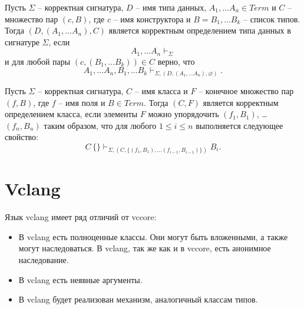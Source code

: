\documentclass{amsart}
\theoremstyle{definition}
\theoremstyle{remark}
\numberwithin{figure}{section}
\begin{document}
Пусть $\Sigma$ -- корректная сигнатура, $D$ -- имя типа данных, $A_1, \ldots A_n \in Term$ и $C$ -- множество пар $(c,B)$, где $c$ -- имя конструктора и $B = B_1, \ldots B_k$ -- список типов.
Тогда $(D, (A_1, \ldots A_n), C)$ является корректным определением типа данных в сигнатуре $\Sigma$, если
\[ A_1, \ldots A_n \vdash_\Sigma \]
и для любой пары $(c, (B_1, \ldots B_k)) \in C$ верно, что
\[ A_1, \ldots A_n, B_1, \ldots B_k \vdash_{\Sigma, (D, (A_1, \ldots A_n), \varnothing)}. \]

Пусть $\Sigma$ -- корректная сигнатура, $C$ -- имя класса и $F$ -- конечное множество пар $(f,B)$, где $f$ -- имя поля и $B \in Term$.
Тогда $(C, F)$ является корректным определением класса, если элементы $F$ можно упорядочить $(f_1, B_1)$, \ldots $(f_n, B_n)$ таким образом, что для любого $1 \leq i \leq n$ выполняется следующее свойство:
\[ C\,\{ \} \vdash_{\Sigma, (C, \{ (f_1, B_1), \ldots (f_{i-1}, B_{i-1}) \})} B_i. \]

\section{Vclang}

Язык vclang имеет ряд отличий от vccore:
\begin{itemize}
\item В vclang есть полноценные классы.
Они могут быть вложенными, а также могут наследоваться.
В vclang, так же как и в vccore, есть анонимное наследование.
\item В vclang есть неявные аргументы.
\item В vclang будет реализован механизм, аналогичный классам типов.
\end{itemize}
\end{document}
